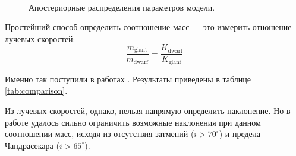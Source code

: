 \begin{figure}
{}\\
\label{fig:dists}
\caption{Апостериорные распределения параметров модели.}
\end{figure}



Простейший способ определить соотношение масс --- это измерить отношение лучевых скоростей:
\[
\frac{m_\text{giant}}{m_\text{dwarf}} = \frac{K_\text{dwarf}}{K_\text{giant}}
\]

Именно так поступили в работах \cite{Kraft, H_alpha}. Результаты приведены в таблице \ref{tab:comparison}.

Из лучевых скоростей, однако, нельзя напрямую определить наклонение. Но в работе \cite{H_alpha} удалось сильно ограничить возможные наклонения при данном соотношении масс, исходя из отсутствия затмений ($i > 70^\circ$) и предела Чандрасекара ($i > 65^\circ$).



